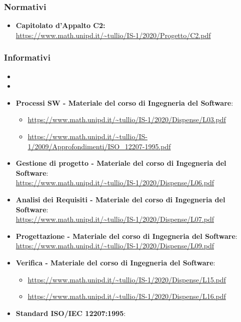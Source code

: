 \subsubsection{Normativi}\label{RiferimentiNormativi}
\begin{itemize}
\item \textbf{Capitolato d'Appalto C2:} \\ \url{https://www.math.unipd.it/~tullio/IS-1/2020/Progetto/C2.pdf}
\end{itemize}

\subsubsection{Informativi}\label{RiferimentiInformativi}
\begin{itemize}
	\item {}
	\item {}
	\item \textbf{Processi SW - Materiale del corso di Ingegneria del Software}:
	\begin{itemize}
		\item \url{https://www.math.unipd.it/~tullio/IS-1/2020/Dispense/L03.pdf}
		\item \url{https://www.math.unipd.it/~tullio/IS-1/2009/Approfondimenti/ISO_12207-1995.pdf}
	\end{itemize}
	\item \textbf{Gestione di progetto - Materiale del corso di Ingegneria del Software}:\\
	\url{https://www.math.unipd.it/~tullio/IS-1/2020/Dispense/L06.pdf}
	\item \textbf{Analisi dei Requisiti - Materiale del corso di Ingegneria del Software}:\\
	\url{https://www.math.unipd.it/~tullio/IS-1/2020/Dispense/L07.pdf}
	\item \textbf{Progettazione - Materiale del corso di Ingegneria del Software}:\\
	\url{https://www.math.unipd.it/~tullio/IS-1/2020/Dispense/L09.pdf}
	\item \textbf{Verifica - Materiale del corso di Ingegneria del Software}:
	\begin{itemize}
		\item \url{https://www.math.unipd.it/~tullio/IS-1/2020/Dispense/L15.pdf}
		\item \url{https://www.math.unipd.it/~tullio/IS-1/2020/Dispense/L16.pdf}
	\end{itemize}
	\item \textbf{Standard ISO/IEC 12207:1995}:\\

\end{itemize}
